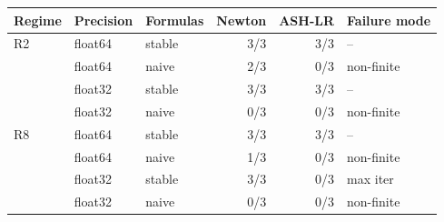 \begin{tabular}{lllrrl}
\toprule
Regime & Precision & Formulas & Newton & ASH-LR & Failure mode \\
\midrule
R2 & float64 & stable & 3/3 & 3/3 & -- \\
 & float64 & naive & 2/3 & 0/3 & non-finite \\
 & float32 & stable & 3/3 & 3/3 & -- \\
 & float32 & naive & 0/3 & 0/3 & non-finite \\
\midrule
R8 & float64 & stable & 3/3 & 3/3 & -- \\
 & float64 & naive & 1/3 & 0/3 & non-finite \\
 & float32 & stable & 3/3 & 0/3 & max iter \\
 & float32 & naive & 0/3 & 0/3 & non-finite \\
\bottomrule
\end{tabular}